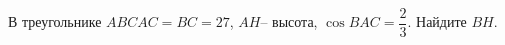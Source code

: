 \begin{ex}
	\begin{condition}
		 В треугольнике \( ABC AC = BC = 27 \), \( AH – \) высота,  \( \cos BAC=\dfrac{2}{3} \).  Найдите \( BH \).
	\end{condition}
\end{ex}